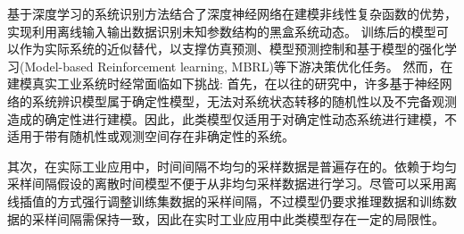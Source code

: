 基于深度学习的系统识别方法结合了深度神经网络在建模非线性复杂函数的优势，实现利用离线输入输出数据识别未知参数结构的黑盒系统动态。
训练后的模型可以作为实际系统的近似替代，以支撑仿真预测、模型预测控制和基于模型的强化学习(Model-based Reinforcement learning, MBRL)等下游决策优化任务。
然而，在建模真实工业系统时经常面临如下挑战:
首先，在以往的研究中，许多基于神经网络的系统辨识模型属于确定性模型，无法对系统状态转移的随机性以及不完备观测造成的确定性进行建模。因此，此类模型仅适用于对确定性动态系统进行建模，不适用于带有随机性或观测空间存在非确定性的系统。

其次，在实际工业应用中，时间间隔不均匀的采样数据是普遍存在的\cite{kidger2021}。依赖于均匀采样间隔假设的离散时间模型不便于从非均匀采样数据进行学习。尽管可以采用离线插值的方式强行调整训练集数据的采样间隔，不过模型仍要求推理数据和训练数据的采样间隔需保持一致，因此在实时工业应用中此类模型存在一定的局限性。

